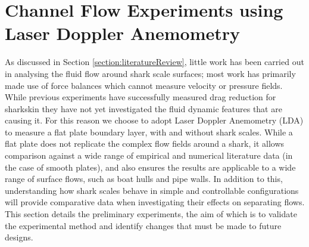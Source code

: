 \documentclass[12pt,oneside,a4paper]{article}
\begin{document}
\section{Channel Flow Experiments using Laser Doppler Anemometry}
As discussed in Section \ref{section:literatureReview}, little work has been carried out in analysing the fluid flow around shark scale surfaces; most work has primarily made use of force balances which cannot measure velocity or pressure fields. While previous experiments have successfully measured drag reduction for sharkskin they have not yet investigated the fluid dynamic features that are causing it. For this reason we choose to adopt Laser Doppler Anemometry (LDA) to measure a flat plate boundary layer, with and without shark scales. While a flat plate does not replicate the complex flow fields around a shark, it allows comparison against a wide range of empirical and numerical literature data (in the case of smooth plates), and also ensures the results are applicable to a wide range of surface flows, such as boat hulls and pipe walls. In addition to this, understanding how shark scales behave in simple and controllable configurations will provide comparative data when investigating their effects on separating flows. This section details the preliminary experiments, the aim of which is to validate the experimental method and identify changes that must be made to future designs.
\end{document}
